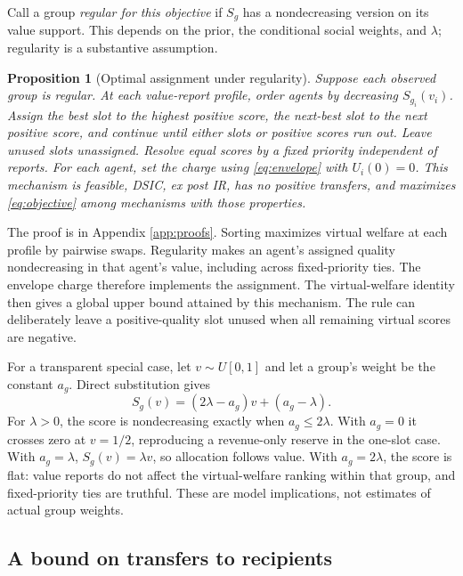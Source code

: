 \documentclass[11pt]{article}
\newtheorem{proposition}{Proposition}
\begin{document}
Call a group \emph{regular for this objective} if $S_g$ has a nondecreasing version on its value support. This depends on the prior, the conditional social weights, and $\lambda$; regularity is a substantive assumption.

\begin{proposition}[Optimal assignment under regularity]\label{prop:optimal}
Suppose each observed group is regular. At each value-report profile, order agents by decreasing $S_{g_i}(v_i)$. Assign the best slot to the highest positive score, the next-best slot to the next positive score, and continue until either slots or positive scores run out. Leave unused slots unassigned. Resolve equal scores by a fixed priority independent of reports. For each agent, set the charge using \eqref{eq:envelope} with $U_i(0)=0$. This mechanism is feasible, DSIC, ex post IR, has no positive transfers, and maximizes \eqref{eq:objective} among mechanisms with those properties.
\end{proposition}

The proof is in Appendix \ref{app:proofs}. Sorting maximizes virtual welfare at each profile by pairwise swaps. Regularity makes an agent's assigned quality nondecreasing in that agent's value, including across fixed-priority ties. The envelope charge therefore implements the assignment. The virtual-welfare identity then gives a global upper bound attained by this mechanism. The rule can deliberately leave a positive-quality slot unused when all remaining virtual scores are negative.

For a transparent special case, let $v\sim U[0,1]$ and let a group's weight be the constant $a_g$. Direct substitution gives
\begin{equation}\label{eq:linear}
S_g(v)=(2\lambda-a_g)v+(a_g-\lambda).
\end{equation}
For $\lambda>0$, the score is nondecreasing exactly when $a_g\le2\lambda$. With $a_g=0$ it crosses zero at $v=1/2$, reproducing a revenue-only reserve in the one-slot case. With $a_g=\lambda$, $S_g(v)=\lambda v$, so allocation follows value. With $a_g=2\lambda$, the score is flat: value reports do not affect the virtual-welfare ranking within that group, and fixed-priority ties are truthful. These are model implications, not estimates of actual group weights.

\subsection*{A bound on transfers to recipients}
\end{document}
